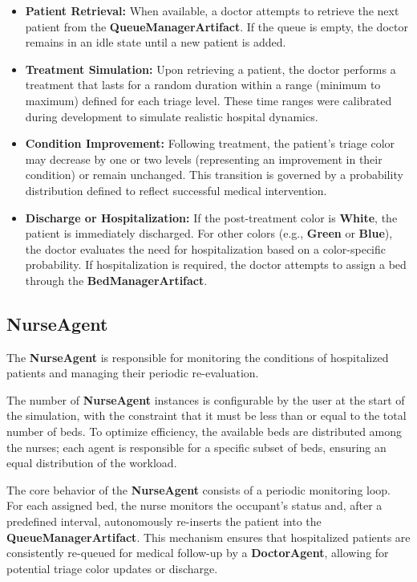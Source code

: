 \documentclass{article}[12pt]
\begin{document}
\begin{itemize}
    \item \textbf{Patient Retrieval:} When available, a doctor attempts to retrieve the next patient from the \textbf{QueueManagerArtifact}. If the queue is empty, the doctor remains in an idle state until a new patient is added.
    \item \textbf{Treatment Simulation:} Upon retrieving a patient, the doctor performs a treatment that lasts for a random duration within a range (minimum to maximum) defined for each triage level. These time ranges were calibrated during development to simulate realistic hospital dynamics.
    \item \textbf{Condition Improvement:} Following treatment, the patient's triage color may decrease by one or two levels (representing an improvement in their condition) or remain unchanged. This transition is governed by a probability distribution defined to reflect successful medical intervention.
    \item \textbf{Discharge or Hospitalization:} If the post-treatment color is \textbf{White}, the patient is immediately discharged. For other colors (e.g., \textbf{Green} or \textbf{Blue}), the doctor evaluates the need for hospitalization based on a color-specific probability. If hospitalization is required, the doctor attempts to assign a bed through the \textbf{BedManagerArtifact}.
\end{itemize}

\subsection{NurseAgent}
\label{subsec:nurse-agent}

\noindent
The \textbf{NurseAgent} is responsible for monitoring the conditions of hospitalized patients and managing their periodic re-evaluation.

\noindent
The number of \textbf{NurseAgent} instances is configurable by the user at the start of the simulation, with the constraint that it must be less than or equal to the total number of beds. To optimize efficiency, the available beds are distributed among the nurses; each agent is responsible for a specific subset of beds, ensuring an equal distribution of the workload.

\noindent
The core behavior of the \textbf{NurseAgent} consists of a periodic monitoring loop. For each assigned bed, the nurse monitors the occupant's status and, after a predefined interval, autonomously re-inserts the patient into the \textbf{QueueManagerArtifact}. This mechanism ensures that hospitalized patients are consistently re-queued for medical follow-up by a \textbf{DoctorAgent}, allowing for potential triage color updates or discharge.
\end{document}
